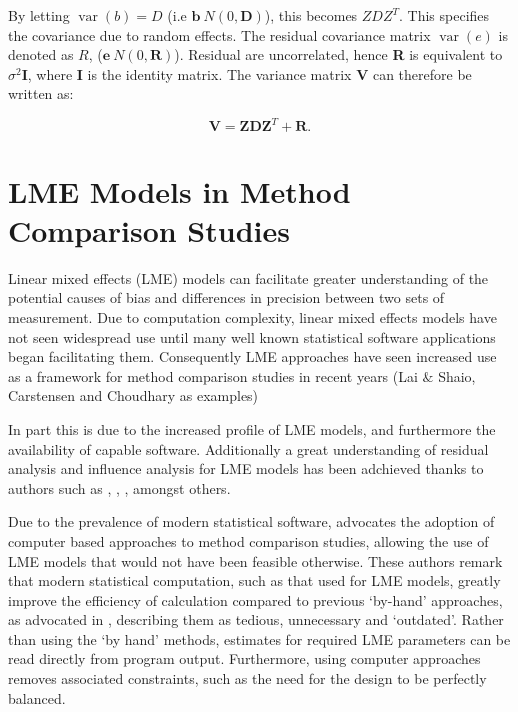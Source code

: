 \documentclass[12pt, a4paper]{report}
\theoremstyle{plain}
\theoremstyle{definition}
\theoremstyle{remark}
\begin{document}
	
	By letting $\operatorname{var}(b) = D$ (i.e $\textbf{b} ~ N(0,\textbf{D})$), this becomes $ZDZ^{T}$. This specifies the covariance due to random
	effects. The residual covariance matrix $\operatorname{var}(e)$ is denoted as $R$, ($\textbf{e} ~ N(0,\textbf{R})$). Residual are uncorrelated,
	hence \textbf{R} is equivalent to $\sigma^{2}$\textbf{I}, where \textbf{I} is the identity matrix. The variance matrix \textbf{V}
	can therefore be written as:
	
	\begin{equation}
	\textbf{V}  = \textbf{ZDZ}^{T} + \textbf{R}.
	\end{equation}
	
	


	\section{LME Models in Method Comparison Studies}
	Linear mixed effects (LME) models can facilitate greater understanding of the potential causes of bias and differences in precision between two sets of measurement. Due to computation complexity, linear mixed effects models have not seen widespread use until many well known statistical software applications began facilitating them. Consequently LME approaches have seen increased use as a framework for method comparison studies in recent years (Lai $\&$ Shaio, Carstensen and Choudhary as examples)
	
	
	In part this is due to the increased profile of LME models, and furthermore the availability of capable software. 	Additionally a great understanding of residual analysis and influence analysis for LME models has been adchieved thanks to authors such as \citet{schabenberger}, \citet{Christensen}, \citet{cook86} \citet{west}, amongst others.
	
Due to the prevalence of modern statistical software, \citet{BXC2008} advocates the adoption of computer based approaches to method comparison studies, allowing the use of LME models that would not have been feasible otherwise. These authors remark that modern statistical computation, such as that used for LME models, greatly improve the efficiency of
	calculation compared to previous `by-hand' approaches, as advocated in \citet{BA99}, describing them as tedious, unnecessary and `outdated'. Rather than using the `by hand' methods, estimates for required LME parameters can be read directly from program output. Furthermore, using computer approaches removes associated constraints, such as the need for the design to be perfectly balanced.
	
\end{document}
